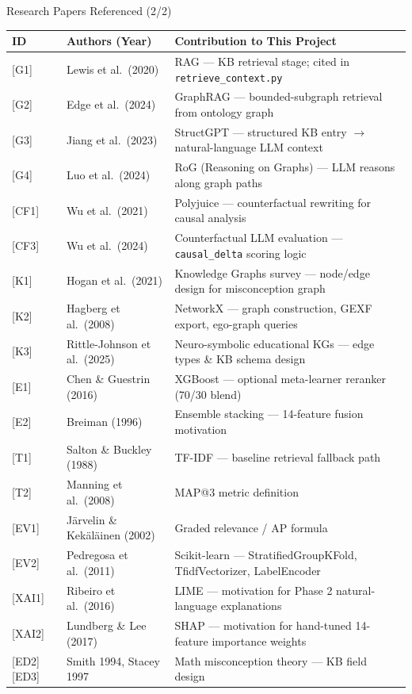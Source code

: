 ﻿\documentclass[aspectratio=169,10pt]{beamer}
\begin{document}
\begin{frame}[shrink=3]{Research Papers Referenced (2/2)}
\scriptsize
\setlength{\tabcolsep}{3pt}
\renewcommand{\arraystretch}{1.2}
\begin{tabular}{p{0.6cm}p{3.2cm}p{7.0cm}}
\toprule
\textbf{ID} & \textbf{Authors (Year)} & \textbf{Contribution to This Project}\\
\midrule
\rowcolor{RowTintA}
{[G1]} & Lewis et al.\ (2020) & RAG --- KB retrieval stage; cited in \texttt{retrieve\_context.py}\\
{[G2]} & Edge et al.\ (2024) & GraphRAG --- bounded-subgraph retrieval from ontology graph\\
\rowcolor{RowTintA}
{[G3]} & Jiang et al.\ (2023) & StructGPT --- structured KB entry $\rightarrow$ natural-language LLM context\\
{[G4]} & Luo et al.\ (2024) & RoG (Reasoning on Graphs) --- LLM reasons along graph paths\\
\rowcolor{RowTintA}
{[CF1]} & Wu et al.\ (2021) & Polyjuice --- counterfactual rewriting for causal analysis\\
{[CF3]} & Wu et al.\ (2024) & Counterfactual LLM evaluation --- \texttt{causal\_delta} scoring logic\\
\rowcolor{RowTintA}
{[K1]} & Hogan et al.\ (2021) & Knowledge Graphs survey --- node/edge design for misconception graph\\
{[K2]} & Hagberg et al.\ (2008) & NetworkX --- graph construction, GEXF export, ego-graph queries\\
\rowcolor{RowTintA}
{[K3]} & Rittle-Johnson et al.\ (2025) & Neuro-symbolic educational KGs --- edge types \& KB schema design\\
{[E1]} & Chen \& Guestrin (2016) & XGBoost --- optional meta-learner reranker (70/30 blend)\\
\rowcolor{RowTintA}
{[E2]} & Breiman (1996) & Ensemble stacking --- 14-feature fusion motivation\\
{[T1]} & Salton \& Buckley (1988) & TF-IDF --- baseline retrieval fallback path\\
\rowcolor{RowTintA}
{[T2]} & Manning et al.\ (2008) & MAP@3 metric definition\\
{[EV1]} & J\"arvelin \& Kek\"al\"ainen (2002) & Graded relevance / AP formula\\
\rowcolor{RowTintA}
{[EV2]} & Pedregosa et al.\ (2011) & Scikit-learn --- StratifiedGroupKFold, TfidfVectorizer, LabelEncoder\\
{[XAI1]} & Ribeiro et al.\ (2016) & LIME --- motivation for Phase 2 natural-language explanations\\
\rowcolor{RowTintA}
{[XAI2]} & Lundberg \& Lee (2017) & SHAP --- motivation for hand-tuned 14-feature importance weights\\
{[ED2][ED3]} & Smith 1994, Stacey 1997 & Math misconception theory --- KB field design\\
\bottomrule
\end{tabular}
\end{frame}
\end{document}
